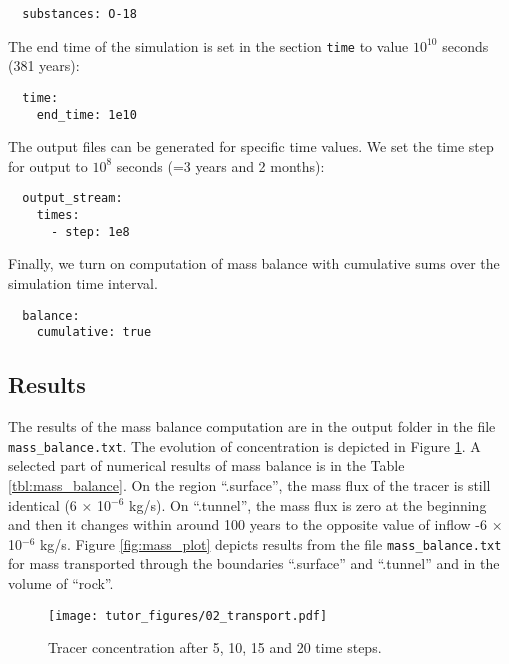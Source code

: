 \begin{verbatim}
  substances: O-18
\end{verbatim}

The end time of the simulation is set in the section \texttt{time} to
value \(10^{10}\) seconds (381 years):

\begin{verbatim}
  time:
    end_time: 1e10
\end{verbatim}

The output files can be generated for specific time values. We set the
time step for output to \(10^8\) seconds (=3 years and 2 months):

\begin{verbatim}
  output_stream:
    times:
      - step: 1e8
\end{verbatim}

Finally, we turn on computation of mass balance with cumulative sums
over the simulation time interval.

\begin{verbatim}
  balance:
    cumulative: true
\end{verbatim}

\subsection{Results}

The results of the mass balance computation are in the output folder in
the file \texttt{mass\_balance.txt}. The evolution of concentration is
depicted in Figure \ref{fig:transport}. A selected part of numerical
results of mass balance is in the Table \ref{tbl:mass_balance}. On the
region ``.surface'', the mass flux of the tracer is still identical (6 ×
10\({}^{-6}\) kg/s). On ``.tunnel'', the mass flux is zero at the
beginning and then it changes within around 100 years to the opposite
value of inflow -6 × 10\({}^{-6}\) kg/s. Figure \ref{fig:mass_plot}
depicts results from the file \texttt{mass\_balance.txt} for mass
transported through the boundaries ``.surface'' and ``.tunnel'' and in
the volume of ``rock''.

\begin{figure}
\hypertarget{fig:transport}{%
\centering
\texttt{[image: tutor\_figures/02\_transport.pdf]}
\caption{Tracer concentration after 5, 10, 15 and 20 time
steps.}\label{fig:transport}
}
\end{figure}

